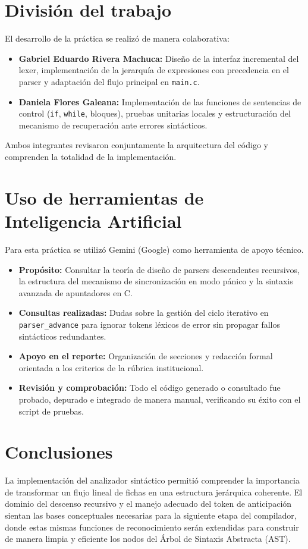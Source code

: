 \documentclass[12pt, letterpaper]{article}
\begin{document}
\section{División del trabajo}
El desarrollo de la práctica se realizó de manera colaborativa:
\begin{itemize}
    \item \textbf{Gabriel Eduardo Rivera Machuca:} Diseño de la interfaz incremental del lexer, implementación de la jerarquía de expresiones con precedencia en el parser y adaptación del flujo principal en \texttt{main.c}.
    \item \textbf{Daniela Flores Galeana:} Implementación de las funciones de sentencias de control (\texttt{if}, \texttt{while}, bloques), pruebas unitarias locales y estructuración del mecanismo de recuperación ante errores sintácticos.
\end{itemize}
Ambos integrantes revisaron conjuntamente la arquitectura del código y comprenden la totalidad de la implementación.

\section{Uso de herramientas de Inteligencia Artificial}
Para esta práctica se utilizó Gemini (Google) como herramienta de apoyo técnico.
\begin{itemize}
    \item \textbf{Propósito:} Consultar la teoría de diseño de parsers descendentes recursivos, la estructura del mecanismo de sincronización en modo pánico y la sintaxis avanzada de apuntadores en C.
    \item \textbf{Consultas realizadas:} Dudas sobre la gestión del ciclo iterativo en \texttt{parser\_advance} para ignorar tokens léxicos de error sin propagar fallos sintácticos redundantes.
    \item \textbf{Apoyo en el reporte:} Organización de secciones y redacción formal orientada a los criterios de la rúbrica institucional.
    \item \textbf{Revisión y comprobación:} Todo el código generado o consultado fue probado, depurado e integrado de manera manual, verificando su éxito con el script de pruebas.
\end{itemize}

\section{Conclusiones}
La implementación del analizador sintáctico permitió comprender la importancia de transformar un flujo lineal de fichas en una estructura jerárquica coherente. El dominio del descenso recursivo y el manejo adecuado del token de anticipación sientan las bases conceptuales necesarias para la siguiente etapa del compilador, donde estas mismas funciones de reconocimiento serán extendidas para construir de manera limpia y eficiente los nodos del Árbol de Sintaxis Abstracta (AST).
\end{document}
